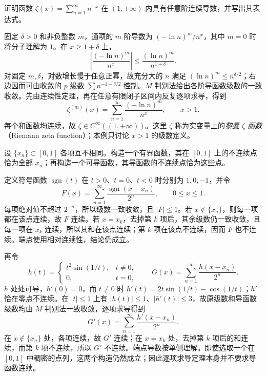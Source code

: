 \begin{example}
\label{ex:zeta-function-smoothness-by-series}
证明函数 $\displaystyle\zeta(x)=\sum_{n=1}^\infty n^{-x}$ 在 $(1,+\infty)$ 内具有任意阶连续导数，并写出其表达式。
\end{example}

\begin{solve}
固定 $\delta>0$ 和非负整数 $m$，通项的 $m$ 阶导数为 $(-\ln n)^m/n^x$，其中 $m=0$ 时将分子理解为 $1$。在 $x\geq1+\delta$ 上，
\[
    \left|\frac{(-\ln n)^m}{n^x}\right|
    \leq\frac{(\ln n)^m}{n^{1+\delta}}.
\]
对固定 $m,\delta$，对数增长慢于任意正幂，故充分大的 $n$ 满足 $(\ln n)^m\leq n^{\delta/2}$；右边因而可由收敛的 $p$ 级数 $\sum n^{-1-\delta/2}$ 控制。$M$ 判别法给出各阶导函数级数的一致收敛。先由连续性定理，再在任意有限闭子区间内反复逐项求导，得到
\[
    \zeta^{(m)}(x)=\sum_{n=1}^\infty\frac{(-\ln n)^m}{n^x},
    \qquad x>1.
\]
每个和函数均连续，故 $\zeta\in C^\infty((1,+\infty))$。这里 $\zeta$ 称为实变量上的\emph{黎曼 $\zeta$ 函数}（Riemann zeta function）；本例只讨论 $x>1$ 的级数定义。
\end{solve}

\begin{example}
\label{ex:series-with-prescribed-discontinuity-set}
设 $\{x_n\}\subset[0,1]$ 各项互不相同。构造一个有界函数，其在 $[0,1]$ 上的不连续点恰为全部 $x_n$；再构造一个可导函数，其导函数的不连续点恰为这些点。
\end{example}

\begin{solve}
定义符号函数 $\operatorname{sgn}(t)$ 在 $t>0$、$t=0$、$t<0$ 时分别为 $1,0,-1$，并令
\[
    F(x)=\sum_{n=1}^\infty\frac{\operatorname{sgn}(x-x_n)}{2^n},
    \qquad 0\leq x\leq1.
\]
每项绝对值不超过 $2^{-n}$，所以级数一致收敛，且 $|F|\leq1$。若 $x\notin\{x_n\}$，则每一项都在该点连续，故 $F$ 连续。若 $x=x_k$，去掉第 $k$ 项后，其余级数仍一致收敛，且每一项在 $x_k$ 连续，所以其和在该点连续；第 $k$ 项在该点不连续，因而 $F$ 也不连续。端点使用相对连续性，结论仍成立。

再令
\[
    h(t)=\begin{cases}t^2\sin(1/t),&t\neq0,\\0,&t=0,\end{cases}
    \qquad
    G(x)=\sum_{n=1}^\infty\frac{h(x-x_n)}{2^n}.
\]
$h$ 处处可导，$h'(0)=0$，而 $t\neq0$ 时 $h'(t)=2t\sin(1/t)-\cos(1/t)$；$h'$ 恰在零点不连续。在 $|t|\leq1$ 上有 $|h(t)|\leq1$、$|h'(t)|\leq3$，故原级数和导函数级数均由 $M$ 判别法一致收敛，逐项求导得到
\[
    G'(x)=\sum_{n=1}^\infty\frac{h'(x-x_n)}{2^n}.
\]
在 $x\notin\{x_n\}$ 处，各项连续，故 $G'$ 连续；在 $x=x_k$ 处，去掉第 $k$ 项后的和连续，而第 $k$ 项不连续，所以 $G'$ 不连续。端点导数按单侧理解。即使选取一个在 $[0,1]$ 中稠密的点列，这两个构造仍然成立；因此逐项求导定理本身并不要求导函数连续。
\end{solve}

